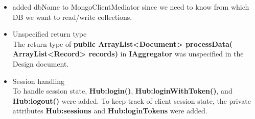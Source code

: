 \documentclass[oneside, english, final]{design}
\begin{document}
\begin{itemize}
  \item{added dbName to MongoClientMediator since we need to know from which DB we want to read/write collections.}
\\

  \item{Unspecified return type}
    \\
    The return type of \textsf{\textbf{public ArrayList<Document> processData( ArrayList<Record> records)}} in \textsf{\textbf{IAggregator}}
was unspecified in the Design document.

  \item{Session handling}
    \\
    To handle session state, \textsf{\textbf{Hub:login()}}, \textsf{\textbf{Hub:loginWithToken()}}, and \textsf{\textbf{Hub:logout()}} were added.
    To keep track of client session state, the private attributes \textsf{\textbf{Hub:sessions}} and \textsf{\textbf{Hub:loginTokens}} were added.

\end{itemize}
\end{document}
